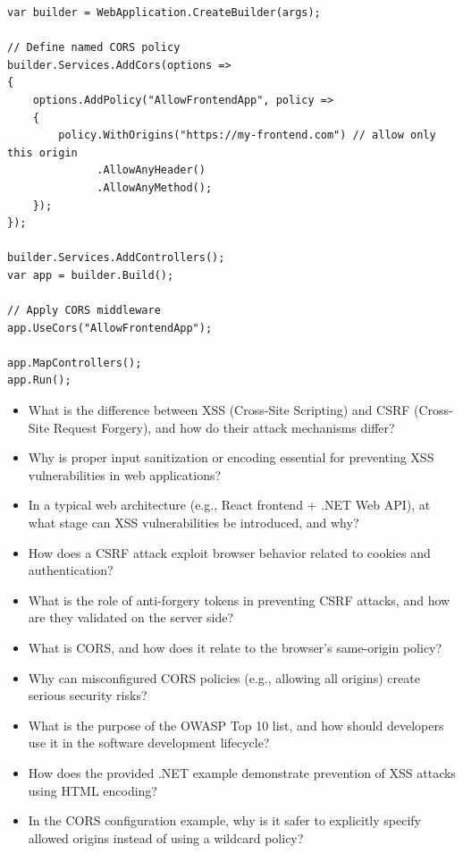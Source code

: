 \begin{lstlisting}
var builder = WebApplication.CreateBuilder(args);

// Define named CORS policy
builder.Services.AddCors(options =>
{
    options.AddPolicy("AllowFrontendApp", policy =>
    {
        policy.WithOrigins("https://my-frontend.com") // allow only this origin
              .AllowAnyHeader()
              .AllowAnyMethod();
    });
});

builder.Services.AddControllers();
var app = builder.Build();

// Apply CORS middleware
app.UseCors("AllowFrontendApp");

app.MapControllers();
app.Run();

\end{lstlisting}



\begin{itemize}
    \item What is the difference between XSS (Cross-Site Scripting) and CSRF (Cross-Site Request Forgery), and how do their attack mechanisms differ?

    \item Why is proper input sanitization or encoding essential for preventing XSS vulnerabilities in web applications?

    \item In a typical web architecture (e.g., React frontend + .NET Web API), at what stage can XSS vulnerabilities be introduced, and why?

    \item How does a CSRF attack exploit browser behavior related to cookies and authentication?

    \item What is the role of anti-forgery tokens in preventing CSRF attacks, and how are they validated on the server side?

    \item What is CORS, and how does it relate to the browser's same-origin policy?

    \item Why can misconfigured CORS policies (e.g., allowing all origins) create serious security risks?

    \item What is the purpose of the OWASP Top 10 list, and how should developers use it in the software development lifecycle?

    \item How does the provided .NET example demonstrate prevention of XSS attacks using HTML encoding?

    \item In the CORS configuration example, why is it safer to explicitly specify allowed origins instead of using a wildcard policy?
\end{itemize}

